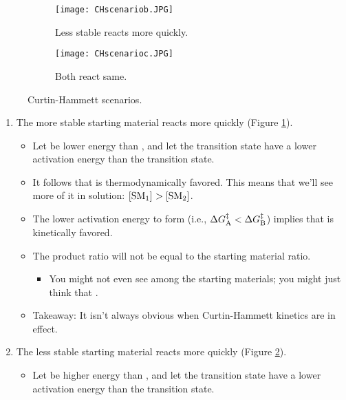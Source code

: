 \documentclass[../notes.tex]{subfiles}
\begin{document}
\begin{itemize}
\begin{figure}[h!]
\begin{subfigure}[b]{0.33\linewidth}
            \label{fig:CHscenarioa}
        \end{subfigure}
        \begin{subfigure}[b]{0.32\linewidth}
            \centering
            \texttt{[image: CHscenariob.JPG]}
            \caption{Less stable reacts more quickly.}
            \label{fig:CHscenariob}
        \end{subfigure}
        \begin{subfigure}[b]{0.33\linewidth}
            \centering
            \texttt{[image: CHscenarioc.JPG]}
            \caption{Both react same.}
            \label{fig:CHscenarioc}
        \end{subfigure}
        \caption{Curtin-Hammett scenarios.}
        \label{fig:CHscenario}
    \end{figure}
    \begin{enumerate}
        \item The more stable starting material reacts more quickly (Figure \ref{fig:CHscenarioa}).
        \begin{itemize}
            \item Let  be lower energy than , and let the  transition state have a lower activation energy than the  transition state.
            \item It follows that  is thermodynamically favored. This means that we'll see more of it in solution: $\cnc{SM1}>\cnc{SM2}$.
            \item The lower activation energy to form  (i.e., $\Delta G_{\ce{A}}^\ddagger<\Delta G_{\ce{B}}^\ddagger$) implies that  is kinetically favored.
            \item The product ratio will not be equal to the starting material ratio.
            \begin{itemize}
                \item You might not even see  among the starting materials; you might just think that .
            \end{itemize}
            \item Takeaway: It isn't always obvious when Curtin-Hammett kinetics are in effect.
        \end{itemize}
        \item The less stable starting material reacts more quickly (Figure \ref{fig:CHscenariob}).
        \begin{itemize}
            \item Let  be higher energy than , and let the  transition state have a lower activation energy than the  transition state.

\end{itemize}
\end{enumerate}
\end{itemize}
\end{document}
